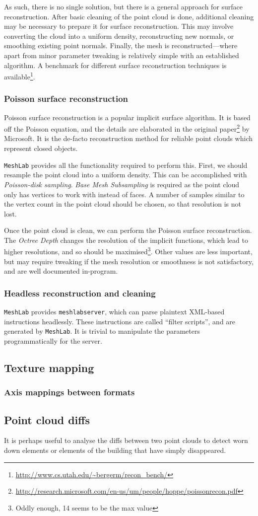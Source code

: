 As such, there is no single solution, but there is a general approach for surface reconstruction. After basic cleaning of the point cloud is done, additional cleaning may be necessary to prepare it for surface reconstruction. This may involve converting the cloud into a uniform density, reconstructing new normals, or smoothing existing point normals. Finally, the mesh is reconstructed---where apart from minor parameter tweaking is relatively simple with an established algorithm. A benchmark for different surface reconstruction techniques is available\footnote{\url{http://www.cs.utah.edu/~bergerm/recon_bench/}}.

\subsubsection{Poisson surface reconstruction}
Poisson surface reconstruction is a popular implicit surface algorithm. It is based off the Poisson equation, and the details are elaborated in the original paper\footnote{\url{http://research.microsoft.com/en-us/um/people/hoppe/poissonrecon.pdf}} by Microsoft. It is the de-facto reconstruction method for reliable point clouds which represent closed objects.

{\tt MeshLab} provides all the functionality required to perform this. First, we should resample the point cloud into a uniform density. This can be accomplished with \emph{Poisson-disk sampling}. \emph{Base Mesh Subsampling} is required as the point cloud only has vertices to work with instead of faces. A number of samples similar to the vertex count in the point cloud should be chosen, so that resolution is not lost.

Once the point cloud is clean, we can perform the Poisson surface reconstruction. The \emph{Octree Depth} changes the resolution of the implicit functions, which lead to higher resolutions, and so should be maximised\footnote{Oddly enough, 14 seems to be the max value}. Other values are less important, but may require tweaking if the mesh resolution or smoothness is not satisfactory, and are well documented in-program.

\subsubsection{Headless reconstruction and cleaning}

{\tt MeshLab} provides {\tt meshlabserver}, which can parse plaintext XML-based instructions headlessly. These instructions are called ``filter scripts'', and are generated by {\tt MeshLab}. It is trivial to manipulate the parameters programmatically for the server.

\subsection{Texture mapping}
\subsubsection{Axis mappings between formats}

\subsection{Point cloud diffs}
It is perhaps useful to analyse the diffs between two point clouds to detect worn down elements or elements of the building that have simply disappeared.


